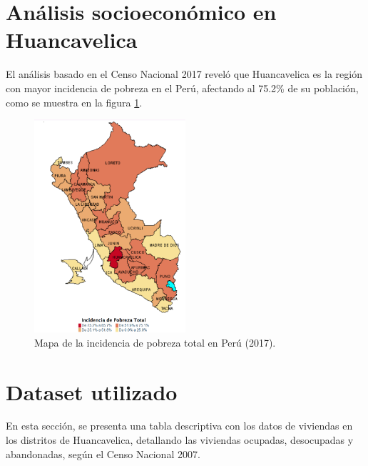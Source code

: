 \documentclass[12pt]{book}
\begin{document}
	\FloatBarrier
	\section{Análisis socioeconómico en Huancavelica}
	El análisis basado en el Censo Nacional 2017 reveló que Huancavelica es la región con mayor incidencia de pobreza en el Perú, afectando al 75.2\% de su población, como se muestra en la figura \ref{fig:peru_pobreza}.
	
	\begin{figure}[H]
		\centering
		\includegraphics[width=0.5\textwidth]{peru_pobreza.png}
		\caption{Mapa de la incidencia de pobreza total en Perú (2017).}
		\label{fig:peru_pobreza}
	\end{figure}
	\FloatBarrier
	\section{Dataset utilizado}
	En esta sección, se presenta una tabla descriptiva con los datos de viviendas en los distritos de Huancavelica, detallando las viviendas ocupadas, desocupadas y abandonadas, según el Censo Nacional 2007.
	
	\begin{table}[H]
		\centering
		\caption{Datos de viviendas en los distritos de Huancavelica.}
		\label{tab:huancavelica_viviendas}
	\end{table}
	
\end{document}
